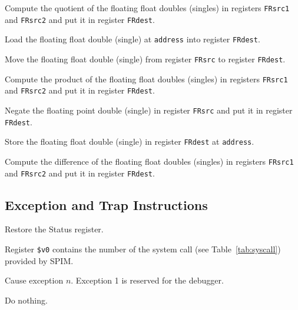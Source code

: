 Compute the quotient of the floating float doubles (singles) in
registers {\tt FRsrc1} and {\tt FRsrc2} and put it in register
{\tt FRdest}.

Load the floating float double (single) at {\tt address} into register
{\tt FRdest}.

Move the floating float double (single) from register {\tt FRsrc} to
register {\tt FRdest}.

Compute the product of the floating float doubles (singles) in
registers {\tt FRsrc1} and {\tt FRsrc2} and put it in register
{\tt FRdest}.

Negate the floating point double (single) in register {\tt FRsrc}
and put it in register {\tt FRdest}.

Store the floating float double (single) in register {\tt FRdest} at
{\tt address}.

Compute the difference of the floating float doubles (singles) in
registers {\tt FRsrc1} and {\tt FRsrc2} and put it in register
{\tt FRdest}.


\subsection {Exception and Trap Instructions}

Restore the Status register.

Register {\tt \$v0} contains the number of the system call (see
Table~\ref{tab:syscall}) provided by SPIM.

Cause exception $n$.  Exception 1 is reserved for the debugger.

Do nothing.


